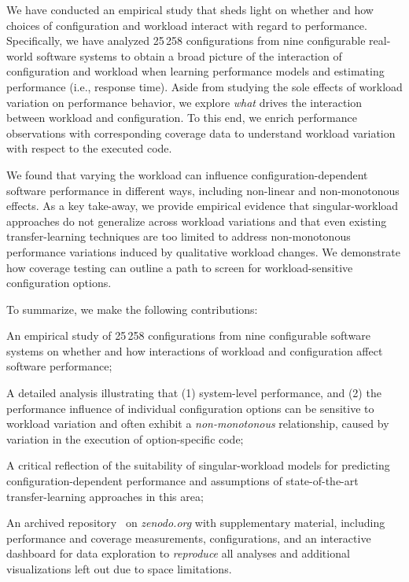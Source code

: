 We have conducted an empirical study that sheds light on whether and how choices of configuration and workload interact with regard to performance. 
Specifically, we have analyzed 25\,258 configurations from nine configurable real-world software systems to obtain a broad picture of the interaction of configuration and workload when learning performance models and estimating  performance (i.e., response time). Aside from studying the sole effects of workload variation on performance behavior, we explore \textit{what} drives the interaction between workload and configuration. To this end, we enrich performance observations with corresponding coverage data to understand workload variation with respect to the executed code.


{
	We found that varying the workload can influence configuration-dependent software performance in different ways, including non-linear and non-monotonous effects. As a key take-away, we provide empirical evidence that singular-workload approaches do not generalize across workload variations  and that even existing transfer-learning techniques are too limited to address non-monotonous performance variations induced by qualitative workload changes. 
We demonstrate how coverage testing can outline a path to screen for workload-sensitive configuration options.
}

To summarize, we make the following contributions: 
\begin{compactitem}
	\item An empirical study of 25\,258 configurations from nine configurable software systems on whether and how interactions of workload and configuration affect software performance;
	{\color{black}
		\item A detailed analysis illustrating that (1) system-level performance, and (2) the performance influence of individual configuration options can be sensitive to workload variation and often exhibit a \textit{non-monotonous} relationship, caused by variation in the execution of option-specific  code;
		
		\item A critical reflection of the suitability of singular-workload models for predicting configuration-dependent performance and assumptions of state-of-the-art transfer-learning approaches in this area;}
	
	\item {An archived repository~\cite{muhlbauer_workload_2023_companion} on \textit{zenodo.org} with supplementary material, including performance and coverage measurements, configurations, and an interactive dashboard for data exploration to \textit{reproduce} all analyses and additional visualizations left out due to space limitations.}
\end{compactitem}

